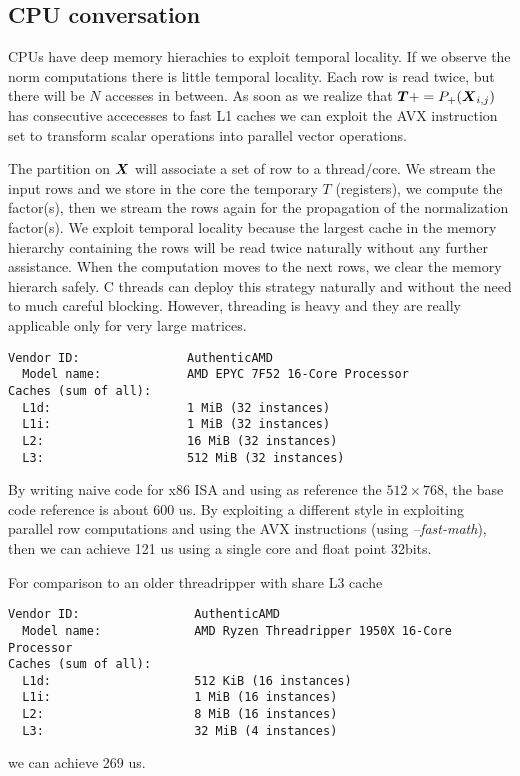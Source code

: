 \documentclass[acmsmall]{acmart}
\begin{document}
\subsection{CPU conversation}
CPUs have deep memory hierachies to exploit temporal locality. If we
observe the norm computations there is little temporal locality. Each
row is read twice, but there will be $N$ accesses in between. As soon
as we realize that ${\boldsymbol T} += P_+({\boldsymbol X}_{i,j})$ has consecutive
accecesses to fast L1 caches we can exploit the AVX instruction set to
transform scalar operations into parallel vector operations.

The partition on ${\boldsymbol X}$ will associate a set of row to a
thread/core. We stream the input rows and we store in the core the
temporary $T$ (registers), we compute the factor(s), then we stream
the rows again for the propagation of the normalization factor(s). We
exploit temporal locality because the largest cache in the memory
hierarchy containing the rows will be read twice naturally without any
further assistance. When the computation moves to the next rows, we
clear the memory hierarch safely. C threads can deploy this strategy
naturally and without the need to much careful blocking. However,
threading is heavy and they are really applicable only for very large
matrices.

{\tiny  \begin{verbatim}
Vendor ID:               AuthenticAMD
  Model name:            AMD EPYC 7F52 16-Core Processor
Caches (sum of all):     
  L1d:                   1 MiB (32 instances)
  L1i:                   1 MiB (32 instances)
  L2:                    16 MiB (32 instances)
  L3:                    512 MiB (32 instances)
\end{verbatim} }

By writing naive code for x86 ISA and using as reference the $512
\times 768$, the base code reference is about 600 us. By exploiting a
different style in exploiting parallel row computations and using the
AVX instructions (using {\em --fast-math}), then we can achieve 121 us
using a single core and float point 32bits.

For comparison to an older threadripper with share L3 cache 
{\tiny  \begin{verbatim}
Vendor ID:                AuthenticAMD
  Model name:             AMD Ryzen Threadripper 1950X 16-Core Processor
Caches (sum of all):      
  L1d:                    512 KiB (16 instances)
  L1i:                    1 MiB (16 instances)
  L2:                     8 MiB (16 instances)
  L3:                     32 MiB (4 instances)
\end{verbatim} }
we can achieve 269 us.
\end{document}
